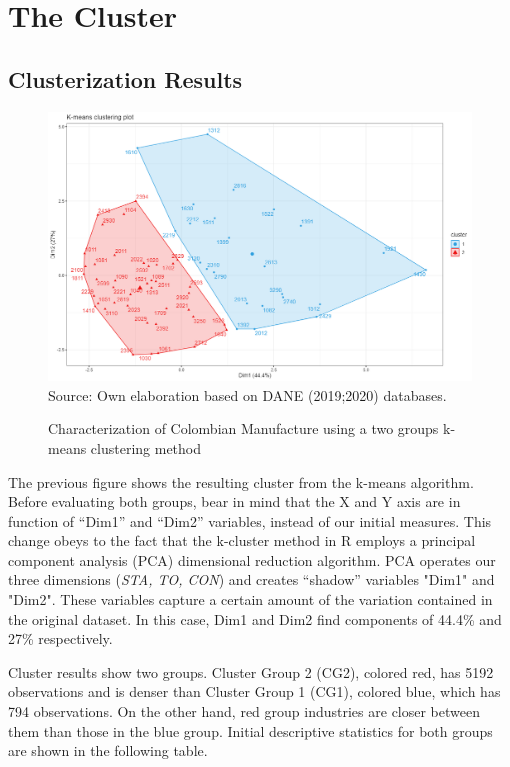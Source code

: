 \documentclass[12pt,a4paper]{article}
\begin{document}
\section{The Cluster}
\subsection{Clusterization Results}
\begin{figure}[H]	
	\caption{Characterization of Colombian Manufacture using a two groups k-means clustering method}
	\centering
	\includegraphics[scale = 0.45]{cluster.png}
	Source: Own elaboration based on DANE (2019;2020) databases.
\end{figure}

The previous figure shows the resulting cluster from the k-means algorithm. Before evaluating both groups, bear in mind that the X and Y axis are in function of “Dim1” and “Dim2” variables, instead of our initial measures. This change obeys to the fact that the k-cluster method in R employs a principal component analysis (PCA) dimensional reduction algorithm. PCA operates our three dimensions (\textit{STA, TO, CON}) and creates “shadow” variables "Dim1" and "Dim2". These variables capture a certain amount of the variation contained in the original dataset. In this case, Dim1 and Dim2 find components of 44.4\% and 27\% respectively. 

Cluster results show two groups. Cluster Group 2 (CG2), colored red, has 5192 observations and is denser than Cluster Group 1 (CG1), colored blue, which has 794 observations. On the other hand, red group industries are closer between them than those in the blue group. Initial descriptive statistics for both groups are shown in the following table. 
\end{document}
